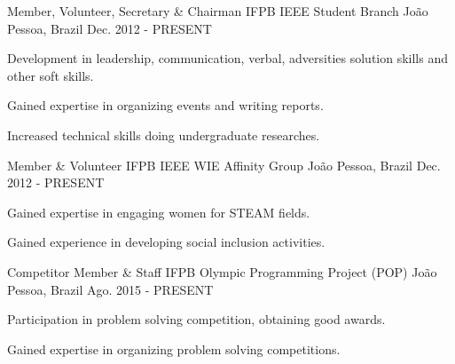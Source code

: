 \begin{cventries}
  \cventry
    {Member, Volunteer, Secretary \& Chairman} %
    {IFPB IEEE Student Branch} %
    {João Pessoa, Brazil} %
    {Dec. 2012 - PRESENT} %
    {
      \begin{cvitems} %
		\item{Development in leadership, communication, verbal, adversities solution skills and other soft skills.}
		\item{Gained expertise in organizing events and writing reports.}
		\item{Increased technical skills doing undergraduate researches.}
      \end{cvitems}
    }
  \cventry
    {Member \& Volunteer} %
    {IFPB IEEE WIE Affinity Group} %
    {João Pessoa, Brazil} %
    {Dec. 2012 - PRESENT} %
    {
      \begin{cvitems} %
		\item{Gained expertise in engaging women for STEAM fields.}
		\item{Gained experience in developing social inclusion activities.}
      \end{cvitems}
    }

  \cventry
    {Competitor Member \& Staff} %
    {IFPB Olympic Programming Project (POP)} %
    {João Pessoa, Brazil} %
    {Ago. 2015 - PRESENT} %
    {
      \begin{cvitems} %
        \item {Participation in problem solving competition, obtaining good awards.}
        \item {Gained expertise in organizing problem solving competitions.}
      \end{cvitems}
    } 


\end{cventries}
